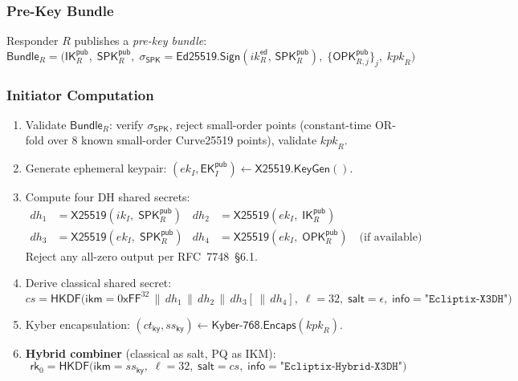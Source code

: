 \documentclass[11pt,a4paper]{article}
\theoremstyle{definition}
\theoremstyle{remark}
\newcommand{\HKDF}{\mathsf{HKDF}}
\renewcommand{\DH}{\mathsf{X25519}}
\newcommand{\KEM}{\mathsf{Kyber\text{-}768}}
\newcommand{\KeyGen}{\mathsf{KeyGen}}
\newcommand{\Encaps}{\mathsf{Encaps}}
\newcommand{\IK}{\mathsf{IK}}
\newcommand{\SPK}{\mathsf{SPK}}
\newcommand{\EK}{\mathsf{EK}}
\newcommand{\OPK}{\mathsf{OPK}}
\newcommand{\rk}{\mathsf{rk}}
\newcommand{\concat}{\,\|\,}
\begin{document}
\subsubsection{Pre-Key Bundle}

Responder $R$ publishes a \emph{pre-key bundle}:
\[
  \mathsf{Bundle}_R = \bigl(\IK_R^{\mathsf{pub}},\;
    \SPK_R^{\mathsf{pub}},\;
    \sigma_{\SPK} = \mathsf{Ed25519.Sign}(\mathit{ik}_R^{\mathsf{ed}},\, \SPK_R^{\mathsf{pub}}),\;
    \{\OPK_{R,j}^{\mathsf{pub}}\}_{j},\;
    \mathit{kpk}_R\bigr)
\]

\subsubsection{Initiator Computation}

\begin{enumerate}[nosep]
  \item Validate $\mathsf{Bundle}_R$: verify $\sigma_{\SPK}$, reject small-order points
        (constant-time OR-fold over 8 known small-order Curve25519 points),
        validate $\mathit{kpk}_R$.
  \item Generate ephemeral keypair: $(ek_I, \EK_I^{\mathsf{pub}}) \gets \DH.\KeyGen()$.
  \item Compute four DH shared secrets:
  \begin{align*}
    \mathit{dh}_1 &= \DH(ik_I,\; \SPK_R^{\mathsf{pub}}) &
    \mathit{dh}_2 &= \DH(ek_I,\; \IK_R^{\mathsf{pub}}) \\
    \mathit{dh}_3 &= \DH(ek_I,\; \SPK_R^{\mathsf{pub}}) &
    \mathit{dh}_4 &= \DH(ek_I,\; \OPK_R^{\mathsf{pub}}) \quad\text{(if available)}
  \end{align*}
  Reject any all-zero output per RFC~7748~\S6.1.
  \item Derive classical shared secret:
  \[
    \mathit{cs} = \HKDF\bigl(\mathsf{ikm} = 0\mathsf{xFF}^{32} \concat
      \mathit{dh}_1 \concat \mathit{dh}_2 \concat \mathit{dh}_3
      [\concat \mathit{dh}_4],\;
      \ell = 32,\; \mathsf{salt} = \epsilon,\;
      \mathsf{info} = \texttt{"Ecliptix-X3DH"}\bigr)
  \]
  \item Kyber encapsulation:
  $(\mathit{ct}_{\mathsf{ky}}, \mathit{ss}_{\mathsf{ky}}) \gets \KEM.\Encaps(\mathit{kpk}_R)$.
  \item \textbf{Hybrid combiner} (classical as salt, PQ as IKM):
  \[
    \rk_0 = \HKDF\bigl(\mathsf{ikm} = \mathit{ss}_{\mathsf{ky}},\;
      \ell = 32,\;
      \mathsf{salt} = \mathit{cs},\;
      \mathsf{info} = \texttt{"Ecliptix-Hybrid-X3DH"}\bigr)
  \]

\end{enumerate}
\end{document}
